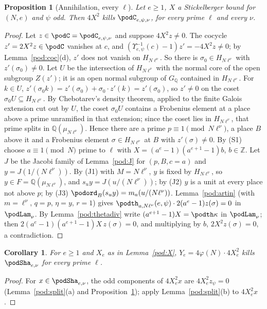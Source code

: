 \documentclass[10pt]{amsart}
\newtheorem{proposition}[theorem]{Proposition}
\newtheorem{corollary}[theorem]{Corollary}
\theoremstyle{definition}
\theoremstyle{remark}
\newcommand{\Z}{\mathbb Z}
\newcommand{\Q}{\mathbb Q}
\begin{document}
\begin{proposition}[Annihilation, every $\ell$]\label{pod:annih}
Let $e\ge1$, $X$ a Stickelberger bound for $(N,e)$ and $\psi$ odd. Then $4X^2$ kills
$\podC_{e,\psi,\nu}$, for every prime $\ell$ and every $\nu$.
\end{proposition}
\begin{proof}
Let $z\in\podC=\podC_{e,\psi,\nu}$ and suppose $4X^2z\ne0$. The cocycle $z'=2X^2z\in\podC$ vanishes
at $c$, and $(\Upsilon_{e,\psi}^{-1}(c)-1)z'=-4X^2z\ne0$; by Lemma~\ref{pod:coc}(d), $z'$ does not
vanish on $H_{N\ell^\nu}$. So there is $\sigma_0\in H_{N\ell^\nu}$ with $z'(\sigma_0)\ne0$. Let $U$ be the intersection of
$H_{N\ell^\nu}$ with the normal core of the open subgroup $Z(z')$; it is an open normal subgroup of
$G_\Q$ contained in $H_{N\ell^\nu}$. For $k\in U$, $z'(\sigma_0k)=z'(\sigma_0)+\sigma_0\cdot z'(k)
=z'(\sigma_0)$, so $z'\ne0$ on the coset $\sigma_0U\subseteq H_{N\ell^\nu}$. By Chebotarev's density
theorem, applied to the finite Galois extension cut out by $U$, the coset $\sigma_0U$ contains a
Frobenius element at a place above a prime unramified in that extension; since the coset lies in
$H_{N\ell^\nu}$, that prime splits in $\Q(\mu_{N\ell^\nu})$. Hence there are a prime $p\equiv1\pmod{N\ell^\nu}$, a place $B$ above it and a Frobenius element $\sigma\in
H_{N\ell^\nu}$ at $B$ with $z'(\sigma)\ne0$. By (S1) choose $a\equiv1\pmod N$ prime to $\ell$ with
$X=(a^e-1)(a^{e+1}-1)b$, $b\in\Z$. Let $J$ be the Jacobi family of Lemma~\ref{pod:J} for $(p,B,c=a)$
and $y=J(1/(N\ell^\nu))$. By (J1) with $M=N\ell^\nu$, $y$ is fixed by $H_{N\ell^\nu}$, so $y\in F=
\Q(\mu_{N\ell^\nu})$, and $s_uy=J(u/(N\ell^\nu))$; by (J2) $y$ is a unit at every place not above $p$;
by (J3) $\podord_B(s_uy)=m_a(u/(N\ell^\nu))$. Lemma~\ref{pod:artin} (with $m=\ell^\nu$, $q=p$,
$\eta=y$, $r=1$) gives $\podth_{a,N\ell^\nu}(e,\psi)\cdot2(a^e-1)z(\sigma)=0$ in $\podLam_\nu$. By
Lemma~\ref{pod:thetadiv} write $(a^{e+1}-1)X=\podth\kappa$ in $\podLam_\nu$; then
$2(a^e-1)(a^{e+1}-1)X\,z(\sigma)=0$, and multiplying by $b$, $2X^2z(\sigma)=0$, a contradiction.
\end{proof}

\begin{corollary}\label{pod:kill}
For $e\ge1$ and $X_e$ as in Lemma~\ref{pod:X}, $Y_e=4\varphi(N)\cdot4X_e^2$ kills $\podSha_{e,\nu}$
for every prime $\ell$.
\end{corollary}
\begin{proof}
For $x\in\podSha_{e,\nu}$, the odd components of $4X_e^2x$ are $4X_e^2z_\psi=0$
(Lemma~\ref{pod:split}(a) and Proposition~\ref{pod:annih}); apply Lemma~\ref{pod:split}(b) to
$4X_e^2x$.
\end{proof}
\end{document}
